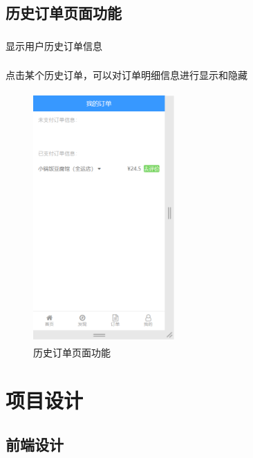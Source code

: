 \subsection{历史订单页面功能}
\subsubsection*{}
显示用户历史订单信息
\subsubsection*{}
点击某个历史订单，可以对订单明细信息进行显示和隐藏
\begin{figure}[H]
    \centering
    \includegraphics[width=5.4cm,height=9.6cm]{figures/3.1.11.png}
    \caption{历史订单页面功能}
\end{figure}


\section{项目设计}

\subsection{前端设计}

